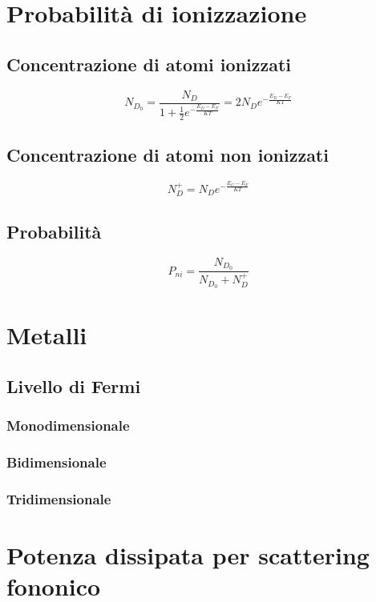 \documentclass[10pt,a4paper]{report}
\begin{document}
\chapter{Probabilità di ionizzazione}

 	\section{Concentrazione di atomi ionizzati}

 	\[
 	N_{D_0} = \frac {N_D} { 1+ \frac {1} {2} e^ {-\frac {E_D-E_F} {KT} } } = 2N_De^{-\frac{E_D-E_F}{KT}}
 	\]

 	\section{Concentrazione di atomi non ionizzati}

 	\[
 	N_D^+= N_De^{-\frac{E_C-E_F}{KT}}
 	\]

 	\section{Probabilità}

 	\[
 	P_{ni}=\frac{N_{D_0}}{N_{D_0}+N_D^+}
 	\]

\chapter{Metalli}

	\section{Livello di Fermi}

		\subsection{Monodimensionale}

		\subsection{Bidimensionale}

		\subsection{Tridimensionale}

\chapter{Potenza dissipata per scattering fononico}
\end{document}
